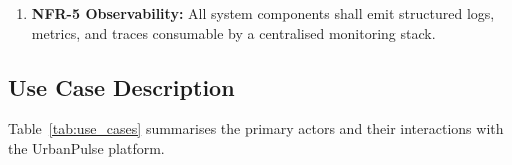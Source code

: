 \begin{enumerate}
      \item \textbf{NFR-5 Observability:} All system components shall emit                                                                                
      structured logs, metrics, and traces consumable by a centralised
      monitoring stack.                                                                                                                                   
  \end{enumerate} 
                                                                                                                                                          
  \subsection{Use Case Description}
  \label{subsec:use_case_desc}

  Table~\ref{tab:use_cases} summarises the primary actors and their                                                                                       
  interactions with the UrbanPulse platform.
                                                                                                                                                          
